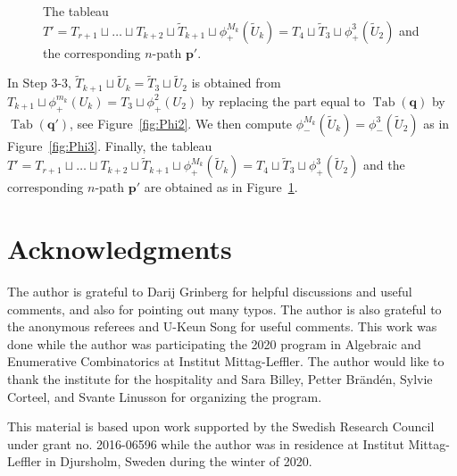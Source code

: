 \documentclass{amsart}
\numberwithin{equation}{section}
\theoremstyle{definition}
\newcommand\Tab{\operatorname{Tab}}
\newcommand\pd{\phi_+}
\newcommand\pu{\phi_-}
\newcommand\pp{\mathbf{p}}
\begin{document}
\begin{figure}
\caption{The tableau $T'=T_{r+1}\sqcup \dots\sqcup T_{k+2}\sqcup
  \widetilde{T}_{k+1} \sqcup \pd^{M_k}(\widetilde{U}_{k})= T_4\sqcup
  \widetilde{T}_{3}\sqcup \pd^{3}(\widetilde{U}_2)$ and the corresponding
  $n$-path $\pp'$.}
   \label{fig:Phi4}
 \end{figure}
 

  In Step 3-3, $\widetilde{T}_{k+1}\sqcup\widetilde{U}_{k}
  =\widetilde{T}_{3}\sqcup\widetilde{U}_{2}$ is obtained from
  $T_{k+1}\sqcup\pd^{m_k}(U_k)=T_3\sqcup\pd^{2}(U_2)$ by replacing the part
  equal to $\Tab(\mathbf{q})$ by $\Tab(\mathbf{q'})$, see Figure~\ref{fig:Phi2}.
  We then compute $\pu^{M_k}(\widetilde{U}_{k})=\pu^{3}(\widetilde{U}_{2})$ as
  in Figure~\ref{fig:Phi3}. Finally, the tableau $T'=T_{r+1}\sqcup \dots\sqcup
  T_{k+2}\sqcup \widetilde{T}_{k+1} \sqcup \pd^{M_k}(\widetilde{U}_{k})=
  T_4\sqcup \widetilde{T}_{3}\sqcup \pd^{3}(\widetilde{U}_2)$ and the
  corresponding $n$-path $\pp'$ are obtained as in Figure~\ref{fig:Phi4}.


\section*{Acknowledgments}
The author is grateful to Darij Grinberg for helpful discussions and useful
comments, and also for pointing out many typos. The author is also grateful to
the anonymous referees and U-Keun Song for useful comments. This work was done
while the author was participating the 2020 program in Algebraic and Enumerative
Combinatorics at Institut Mittag-Leffler. The author would like to thank the
institute for the hospitality and Sara Billey, Petter Br\"and\'en, Sylvie
Corteel, and Svante Linusson for organizing the program.


This material is based upon work supported by the Swedish Research
Council under grant no. 2016-06596 while the author was in residence at Institut
Mittag-Leffler in Djursholm, Sweden during the winter of 2020.




\end{document}
